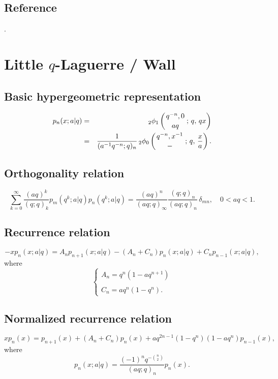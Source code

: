 \documentclass[envcountchap,graybox]{svmono}
\newcommand{\qhyp}[5]{\mbox{}_{#1}{\phi}_{#2}
\left(\genfrac{}{}{0pt}{}{#3}{#4}\,;\,q,\,#5\right)}
\newcommand{\qhyp}[5]{\,\mbox{}_{#1}\phi_{#2}\!\left(
  \genfrac{}{}{0pt}{}{#3}{#4};#5\right)}
\begin{document}
{{\subsection*{Reference}
\cite{AskeyWilson85}.


\section{Little $q$-Laguerre / Wall}
\par\setcounter{equation}{0}

\subsection*{Basic hypergeometric representation}
\begin{eqnarray}
\label{DefLittleqLaguerre}
p_n(x;a|q)&=&\qhyp{2}{1}{q^{-n},0}{aq}{qx}\\
&=&\frac{1}{(a^{-1}q^{-n};q)_n}\,\qhyp{2}{0}{q^{-n},x^{-1}}{-}{\frac{x}{a}}.\nonumber
\end{eqnarray}

\newpage

\subsection*{Orthogonality relation}
\begin{equation}
\label{OrtLittleqLaguerre}
\sum_{k=0}^{\infty}\frac{(aq)^k}{(q;q)_k}p_m(q^k;a|q)p_n(q^k;a|q)=
\frac{(aq)^n}{(aq;q)_{\infty}}\frac{(q;q)_n}{(aq;q)_n}\,\delta_{mn},\quad 0<aq<1.
\end{equation}

\subsection*{Recurrence relation}
\begin{equation}
\label{RecLittleqLaguerre}
-xp_n(x;a|q)=A_np_{n+1}(x;a|q)-\left(A_n+C_n\right)p_n(x;a|q)+C_np_{n-1}(x;a|q),
\end{equation}
where
$$\left\{\begin{array}{l}A_n=q^n(1-aq^{n+1})\\
\\
C_n=aq^n(1-q^n).\end{array}\right.$$

\subsection*{Normalized recurrence relation}
\begin{equation}
\label{NormRecLittleqLaguerre}
xp_n(x)=p_{n+1}(x)+(A_n+C_n)p_n(x)+aq^{2n-1}(1-q^n)(1-aq^n)p_{n-1}(x),
\end{equation}
where
$$p_n(x;a|q)=\frac{(-1)^nq^{-\binom{n}{2}}}{(aq;q)_n}p_n(x).$$

}}
\end{document}
